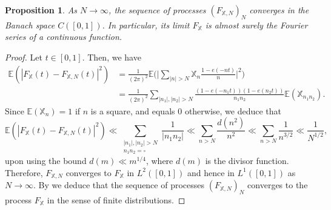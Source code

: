\documentclass[10pt]{amsart}
\theoremstyle{plain}
\newtheorem{pro}[thm]{Proposition}
\theoremstyle{definition}
\newcommand{\X}{\mathbb{X}}
\newcommand{\ex}{\mathbb{E}}
\begin{document}
\begin{pro}\label{pro: ContinuityRandom }
As $N\to \infty$, the sequence of processes $(F_{\X, N})_{N}$ converges in the Banach space $C([0, 1])$. In particular, its limit $F_{\X}$ is almost surely the Fourier series of a continuous function.
\end{pro}

\begin{proof}
Let $t\in [0, 1]$. Then, we have
\begin{align*}\ex\left(|F_{\X}(t)- F_{\X, N}(t)|^2\right)
&= \frac{1}{(2\pi)^2}\ex\Big(\Big|\sum_{|n|>N} \X_n \frac{1-e(-nt)}{n}\Big|^2\Big)\\
& = \frac{1}{(2\pi)^2}\sum_{|n_1|, |n_2|>N} \frac{(1-e(-n_1t))(1-e(n_2t))}{n_1n_2}\ex\left(\X_{n_1n_2}\right).
\end{align*}
Since $\ex(\X_n)=1$ if $n$ is a square, and equals $0$ otherwise, we deduce that
\[
\ex\left(|F_{\X}(t)- F_{\X, N}(t)|^2\right) \ll \sum_{\substack{|n_1|, |n_2|>N \\ n_1n_2=\square}} \frac{1}{|n_1n_2|}\ll \sum_{n> N} \frac{d(n^2)}{n^2} \ll \sum_{n> N} \frac{1}{n^{3/2}} \ll \frac{1}{N^{1/2}},\]
upon using the bound $d(m)\ll m^{1/4}$, where $d(m)$ is the divisor function. Therefore, $F_{\X, N}$ converges to $F_{\X}$ in $L^{2}([0, 1])$ and hence in $L^1([0, 1])$ as $N\to \infty$. By \cite[Lem.\,3]{Ko} we deduce that the sequence of processes $(F_{\X, N})_{N}$ converges to the process $F_{\X}$ in the sense of finite distributions.


\end{proof}
\end{document}
